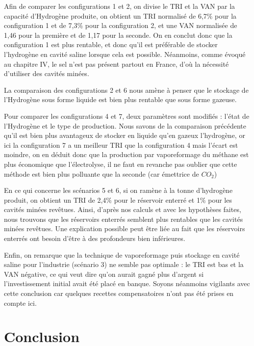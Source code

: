 \documentclass[11pt,french,a4paper]{article}
\begin{document}
Afin de comparer les configurations 1 et 2, on divise le TRI et la VAN par la capacité d’Hydrogène produite, on obtient un TRI normalisé de 6,7\% pour la configuration 1 et de 7,3\% pour la configuration 2, et une VAN normalisée de 1,46 pour la première et de 1,17 pour la seconde. On en conclut donc que la configuration 1 est plus rentable, et donc qu’il est préférable de stocker l'hydrogène en cavité saline lorsque cela est possible. Néanmoins, comme évoqué au chapitre IV, le sel n’est pas présent partout en France, d’où la nécessité d’utiliser des cavités minées.  

La comparaison des configurations 2 et 6 nous amène à penser que le stockage de l’Hydrogène sous forme liquide est bien plus rentable que sous forme gazeuse. 

Pour comparer les configurations 4 et 7, deux paramètres sont modifiés : l’état de l’Hydrogène et le type de production. Nous savons de la comparaison précédente qu’il est bien plus avantageux de stocker en liquide qu’en gazeux l’hydrogène, or ici la configuration 7 a un meilleur TRI que la configuration 4 mais l’écart est moindre, on en déduit donc que la production par vaporeformage du méthane est plus économique que l’électrolyse, il ne faut en revanche pas oublier que cette méthode est bien plus polluante que la seconde (car émettrice de $CO_2$) 

En ce qui concerne les scénarios 5 et 6, si on ramène à la tonne d’hydrogène produit, on obtient un TRI de 2,4\% pour le réservoir enterré et 1\% pour les cavités minées revêtues. Ainsi, d’après nos calculs et avec les hypothèses faites, nous trouvons que les réservoirs enterrés semblent plus rentables que les cavités minées revêtues. Une explication possible peut être liée au fait que les réservoirs enterrés ont besoin d’être à des profondeurs bien inférieures.  

Enfin, on remarque que la technique de vaporeformage puis stockage en cavité saline pour l’industrie (scénario 3) ne semble pas optimale : le TRI est bas et la VAN négative, ce qui veut dire qu’on aurait gagné plus d’argent si l’investissement initial avait été placé en banque. Soyons néanmoins vigilants avec cette conclusion car quelques recettes compensatoires n’ont pas été prises en compte ici. 






\section*{Conclusion}  
\end{document}
